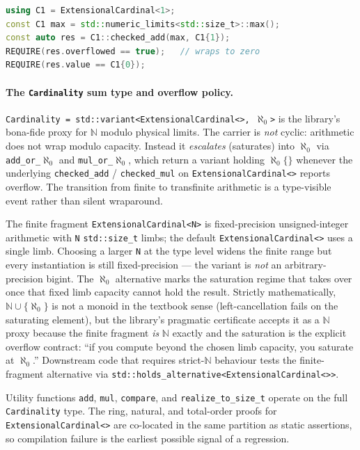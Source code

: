 \documentclass[11pt, a4paper]{report}
\begin{document}
\begin{lstlisting}[language=C++, caption={Cardinality: overflow-aware addition (from \texttt{cardinality\_test.cpp}).}, label={lst:cardinality-overflow}]
using C1 = ExtensionalCardinal<1>;
const C1 max = std::numeric_limits<std::size_t>::max();
const auto res = C1::checked_add(max, C1{1});
REQUIRE(res.overflowed == true);   // wraps to zero
REQUIRE(res.value == C1{0});
\end{lstlisting}

\paragraph{The \texttt{Cardinality} sum type and overflow policy.}
\texttt{Cardinality = std::variant<ExtensionalCardinal<>, $\aleph_0$>} is the library's bona-fide proxy for $\mathbb{N}$ modulo physical limits. The carrier is \emph{not} cyclic: arithmetic does not wrap modulo capacity. Instead it \emph{escalates} (saturates) into $\aleph_0$ via \texttt{add\_or\_}$\aleph_0$ and \texttt{mul\_or\_}$\aleph_0$, which return a variant holding $\aleph_0\{\}$ whenever the underlying \texttt{checked\_add} / \texttt{checked\_mul} on \texttt{ExtensionalCardinal<>} reports overflow. The transition from finite to transfinite arithmetic is a type-visible event rather than silent wraparound.

The finite fragment \texttt{ExtensionalCardinal<N>} is fixed-precision unsigned-integer arithmetic with \texttt{N} \texttt{std::size\_t} limbs; the default \texttt{ExtensionalCardinal<>} uses a single limb. Choosing a larger \texttt{N} at the type level widens the finite range but every instantiation is still fixed-precision --- the variant is \emph{not} an arbitrary-precision bigint. The $\aleph_0$ alternative marks the saturation regime that takes over once that fixed limb capacity cannot hold the result. Strictly mathematically, $\mathbb{N} \cup \{\aleph_0\}$ is not a monoid in the textbook sense (left-cancellation fails on the saturating element), but the library's pragmatic certificate accepts it as a $\mathbb{N}$ proxy because the finite fragment \emph{is} $\mathbb{N}$ exactly and the saturation is the explicit overflow contract: ``if you compute beyond the chosen limb capacity, you saturate at $\aleph_0$.'' Downstream code that requires strict-$\mathbb{N}$ behaviour tests the finite-fragment alternative via \texttt{std::holds\_alternative<ExtensionalCardinal<>>}.

Utility functions \texttt{add}, \texttt{mul}, \texttt{compare}, and \texttt{realize\_to\_size\_t} operate on the full \texttt{Cardinality} type.
The ring, natural, and total-order proofs for \texttt{ExtensionalCardinal<>} are co-located in the same partition as static assertions, so compilation failure is the earliest possible signal of a regression.
\end{document}
